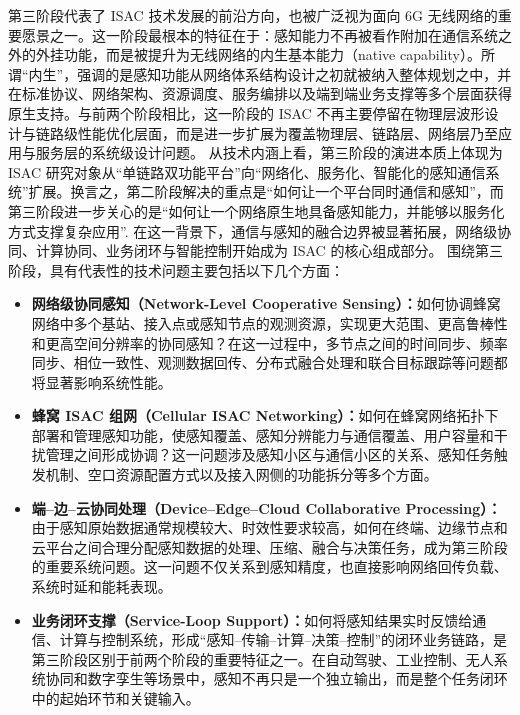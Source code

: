 第三阶段代表了 ISAC 技术发展的前沿方向，也被广泛视为面向 6G 无线网络的重要愿景之一\cite{Liu2022ISAC,Gonzalez2024integrated,Saad2020Vision6G}。这一阶段最根本的特征在于：感知能力不再被看作附加在通信系统之外的外挂功能，而是被提升为无线网络的内生基本能力（native capability）。所谓“内生”，强调的是感知功能从网络体系结构设计之初就被纳入整体规划之中，并在标准协议、网络架构、资源调度、服务编排以及端到端业务支撑等多个层面获得原生支持。与前两个阶段相比，这一阶段的 ISAC 不再主要停留在物理层波形设计与链路级性能优化层面，而是进一步扩展为覆盖物理层、链路层、网络层乃至应用与服务层的系统级设计问题\cite{Liu2022ISAC,Zhang2020perceptive}。
从技术内涵上看，第三阶段的演进本质上体现为 ISAC 研究对象从“单链路双功能平台”向“网络化、服务化、智能化的感知通信系统”扩展。换言之，第二阶段解决的重点是“如何让一个平台同时通信和感知”，而第三阶段进一步关心的是“如何让一个网络原生地具备感知能力，并能够以服务化方式支撑复杂应用”\cite{Zhang2020perceptive,Cui2024integrated}. 在这一背景下，通信与感知的融合边界被显著拓展，网络级协同、计算协同、业务闭环与智能控制开始成为 ISAC 的核心组成部分。
围绕第三阶段，具有代表性的技术问题主要包括以下几个方面：
\begin{itemize}
    \item \textbf{网络级协同感知（Network-Level Cooperative Sensing）：}如何协调蜂窝网络中多个基站、接入点或感知节点的观测资源，实现更大范围、更高鲁棒性和更高空间分辨率的协同感知\cite{Zhang2020perceptive,Cui2024integrated}？在这一过程中，多节点之间的时间同步、频率同步、相位一致性、观测数据回传、分布式融合处理和联合目标跟踪等问题都将显著影响系统性能。
    \item \textbf{蜂窝 ISAC 组网（Cellular ISAC Networking）：}如何在蜂窝网络拓扑下部署和管理感知功能，使感知覆盖、感知分辨能力与通信覆盖、用户容量和干扰管理之间形成协调\cite{Liu2022ISAC,Zhang2020perceptive}？这一问题涉及感知小区与通信小区的关系、感知任务触发机制、空口资源配置方式以及接入网侧的功能拆分等多个方面。
    \item \textbf{端--边--云协同处理（Device--Edge--Cloud Collaborative Processing）：}由于感知原始数据通常规模较大、时效性要求较高，如何在终端、边缘节点和云平台之间合理分配感知数据的处理、压缩、融合与决策任务，成为第三阶段的重要系统问题\cite{Gonzalez2024integrated,Saad2020Vision6G}。这一问题不仅关系到感知精度，也直接影响网络回传负载、系统时延和能耗表现。
    \item \textbf{业务闭环支撑（Service-Loop Support）：}如何将感知结果实时反馈给通信、计算与控制系统，形成“感知--传输--计算--决策--控制”的闭环业务链路，是第三阶段区别于前两个阶段的重要特征之一\cite{Liu2022ISAC,Saad2020Vision6G}。在自动驾驶、工业控制、无人系统协同和数字孪生等场景中，感知不再只是一个独立输出，而是整个任务闭环中的起始环节和关键输入。
\end{itemize}

